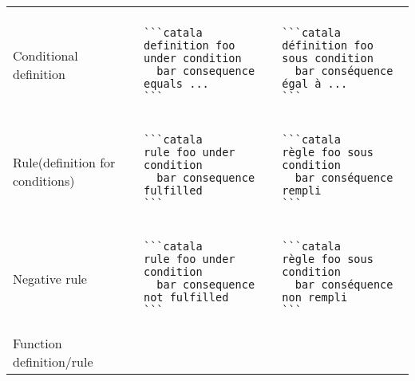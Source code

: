 \documentclass[a3paper,landscape]{article}
\begin{document}
\begin{multicols*}{2}
\begin{center}
\begin{tabular}{p{}p{}p{}}
      \vspace*{-1.75em}
      \\
      Conditional definition                  &
      \vspace*{-1.75em}
      \begin{verbatim}
```catala
definition foo under condition
  bar consequence equals ...
```
\end{verbatim}
      \vspace*{-1.75em}
                                              &
      \vspace*{-1.75em}
      \begin{verbatim}
```catala
définition foo sous condition
  bar conséquence égal à ...
```
\end{verbatim}
      \vspace*{-1.75em}
      \\
      Rule\newline(definition for conditions) &
      \vspace*{-1.75em}
      \begin{verbatim}
```catala
rule foo under condition
  bar consequence fulfilled
```
\end{verbatim}
      \vspace*{-1.75em}
                                              &
      \vspace*{-1.75em}
      \begin{verbatim}
```catala
règle foo sous condition
  bar conséquence rempli
```
\end{verbatim}
      \vspace*{-1.75em}
      \\
      Negative rule                           &
      \vspace*{-1.75em}
      \begin{verbatim}
```catala
rule foo under condition
  bar consequence not fulfilled
```
\end{verbatim}
      \vspace*{-1.75em}
                                              &
      \vspace*{-1.75em}
      \begin{verbatim}
```catala
règle foo sous condition
  bar conséquence non rempli
```
\end{verbatim}
      \vspace*{-1.75em}
      \\
      Function definition/rule                &
      \vspace*{-1.75em}

\end{tabular}
\end{center}
\end{multicols*}
\end{document}
